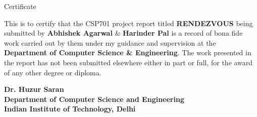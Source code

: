 \begin{center}
\LARGE{ Certificate} 
\end{center}

\vspace{0.5in}

This is to certify that the CSP701 project report titled {\bfseries RENDEZVOUS} being submitted by
{\bfseries Abhishek Agarwal} \& {\bfseries Harinder Pal} is a record of bona fide work carried out by them under my guidance and supervision at the {\bfseries Department of Computer Science \& Engineering}. The work presented in the report has not been submitted elsewhere either in part or full, for the award of any other degree or diploma.

\vspace{1.5in}


{\bfseries Dr. Huzur Saran} \\
{\bfseries Department of Computer Science and Engineering} \\
{\bfseries Indian Institute of Technology, Delhi}\\ 
